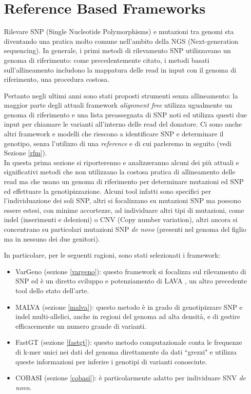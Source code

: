 \documentclass[../main.tex]{subfiles}
\begin{document}
\section{Reference Based Frameworks}
\label{rbm}

Rilevare SNP (Single Nucleotide Polymorphisms) e mutazioni tra genomi sta diventando una pratica molto comune nell'ambito della NGS (Next-generation sequencing). In generale, i primi metodi di rilevamento SNP utilizzavano un genoma di riferimento: come precedentemente citato, i metodi basati sull'allineamento includono la mappatura delle read in input con il genoma di riferimento, una procedura costosa. 

Pertanto negli ultimi anni sono stati proposti strumenti senza allineamento: la maggior parte degli attuali framework \textit{alignment free} utilizza ugualmente un genoma di riferimento e una lista preassegnata di SNP noti ed utilizza questi due input per chiamare le varianti all'interno delle read del donatore. Ci sono anche altri framework e modelli che riescono a identificare SNP e determinare il genotipo, senza l'utilizzo di una \textit{reference} e di cui parleremo in seguito (vedi Sezione \ref{rfm}). \\

In questa prima sezione si riporterenno e analizzeranno alcuni dei più attuali e significativi metodi che non utilizzano la costosa pratica di allineamento delle read ma che usano un genoma di riferimento per determinare mutazioni ed SNP ed effettuare la genotipizzazione. Alcuni tool infatti sono specifici per l'individuazione dei soli SNP, altri si focalizzano su mutazioni SNP ma possono essere estesi, con minime accortezze, ad individuare altri tipi di mutazioni, come indel (inserimenti e delezioni) o CNV (Copy number variation), altri ancora si concentrano su particolari mutazioni SNP \textit{de novo} (presenti nel genoma del figlio ma in nessuno dei due genitori).

In particolare, per le seguenti ragioni, sono stati selezionati i framework:
\begin{itemize} 
\item VarGeno (sezione \ref{vargeno}): questo framework \cite{sun-medvedev2018vargeno} si focalizza sul rilevamento di SNP ed è un diretto sviluppo e potenziamento di LAVA \cite{shajii2016lava}, un altro precedente tool dello stato dell'arte.
\item MALVA (sezione \ref{malva}): questo metodo \cite{bernardini2019malva} è in grado di genotipizzare SNP e indel multi-allelici, anche in regioni del genoma ad alta densità, e di gestire efficacemente un numero grande di varianti.
\item FastGT (sezione \ref{fastgt}): questo metodo computazionale \cite{pajuste2017fastgt} conta le frequenze di k-mer unici nei dati del genoma direttamente da dati ``grezzi" e utilizza queste informazioni per inferire i genotipi di varianti conosciute. 
\item COBASI (sezione \ref{cobasi}): \cite{gomez-romero2018cobasi} è particolarmente adatto per individuare SNV \textit{de novo}. 
\end{itemize} 
\end{document}

